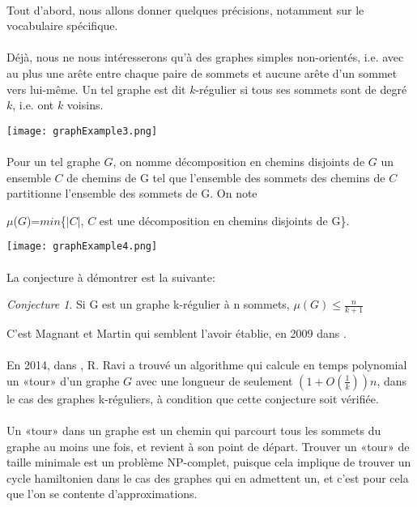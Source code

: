 \documentclass[a4paper]{article}
\theoremstyle{definition}
\theoremstyle{remark}
\newtheorem{conjecture}{Conjecture}[section]
\begin{document}
\paragraph{}
Tout d'abord, nous allons donner quelques précisions, notamment sur le vocabulaire spécifique.


\paragraph{}
Déjà, nous ne nous intéresserons qu'à des graphes simples non-orientés, i.e. avec au plus une arête entre chaque paire de sommets et aucune arête
d'un sommet vers lui-même. Un tel graphe est dit $k$-régulier si tous ses
sommets sont de degré $k$, i.e. ont $k$ voisins.


\texttt{[image: graphExample3.png]}


\paragraph{}
Pour un tel graphe $G$, on nomme décomposition en chemins disjoints de $G$  un ensemble $C$ de chemins de G tel que l'ensemble des sommets des chemins 
de $C$ partitionne l'ensemble des sommets de G. On note


$\mu$($G$)=$min$\{$|C|$, $C$ est une décomposition en chemins disjoints de G\}.

\texttt{[image: graphExample4.png]}


\paragraph{}
La conjecture à démontrer est la suivante:
\begin{conjecture}
Si G est un graphe k-régulier à n sommets, $\mu(G) \leq \frac{n}{k+1}$
\end{conjecture}
C'est Magnant et Martin qui semblent l'avoir établie, en 2009 dans \cite{MagnantMartin}.


\paragraph{}
En 2014, dans \cite{FeigeRaviSingh}, R. Ravi a trouvé un algorithme qui calcule en temps polynomial un «tour» d'un graphe $G$ avec une longueur de seulement $(1 + O
(\frac{1}{k}))n$, dans le cas des graphes k-réguliers, à condition que cette 
conjecture soit vérifiée.


\paragraph{}
Un «tour» dans un graphe est un chemin qui parcourt tous les sommets
du graphe au moins une fois, et revient à son point de départ. Trouver
un «tour» de taille minimale est un problème NP-complet, puisque cela implique de trouver un cycle hamiltonien dans le cas des graphes qui en admettent un, et c'est pour cela que l'on se contente d'approximations.
\end{document}
